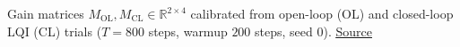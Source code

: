 Gain matrices $M_\mathrm{OL}, M_\mathrm{CL} \in \mathbb{R}^{2 \times 4}$ calibrated from open-loop (OL) and closed-loop LQI (CL) trials ($T=800$ steps, warmup $200$ steps, seed 0). \href{https://github.com/tahmidazam/gg4/blob/main/notebooks/gain_matrix/gain_matrix.ipynb}{\underline{Source}}%